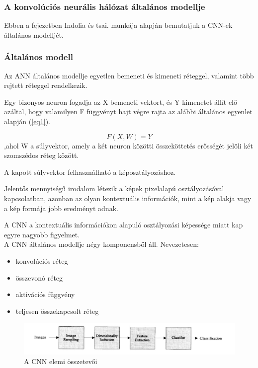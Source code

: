 \documentclass[12pt,a4]{article}
\begin{document}
	\subsubsection{A konvolúciós neurális hálózat általános modellje}
    Ebben a fejezetben Indolia és tsai. \cite{CNN} munkája alapján bemutatjuk a CNN-ek általános modelljét.
 
	\subsubsection{Általános modell}
	Az ANN általános modellje egyetlen bemeneti és kimeneti réteggel,
	valamint több rejtett réteggel rendelkezik.
	
	Egy bizonyos 
	neuron fogadja az X bemeneti vektort, és Y kimenetet állít elő azáltal,
	hogy valamilyen F függvényt hajt végre rajta az alábbi általános egyenlet alapján (\ref{eq1}).
	\begin{mdframed}
	\begin{equation}
    \label{eq1}
			F(X, W) = Y
	\end{equation}
	,ahol W a súlyvektor, amely a két neuron közötti összeköttetés erősségét jelöli két szomszédos réteg között.
 	\end{mdframed}

	A kapott súlyvektor felhasználható a képosztályozáshoz.
	
	Jelentős mennyiségű irodalom létezik a képek pixelalapú osztályozásával
	kapcsolatban, azonban az olyan kontextuális információk, mint a kép alakja vagy 
	a kép formája jobb eredményt adnak.
	
	A CNN a kontextuális információkon alapuló osztályozási képessége miatt kap egyre nagyobb figyelmet.\\
	
	
	A CNN általános modellje négy komponensből áll. Nevezetesen: 
	\begin{itemize}
		\item konvolúciós réteg
		\item összevonó réteg
		\item aktivációs függvény
		\item teljesen összekapcsolt réteg
	\end{itemize}

    \begin{figure}[h]	
		\centering
		\includegraphics[width=1\linewidth]{element}
		\caption{\cite{CNN} A CNN elemi összetevői}
        \label{fig:cnnelem}
	\end{figure}
 
\end{document}
